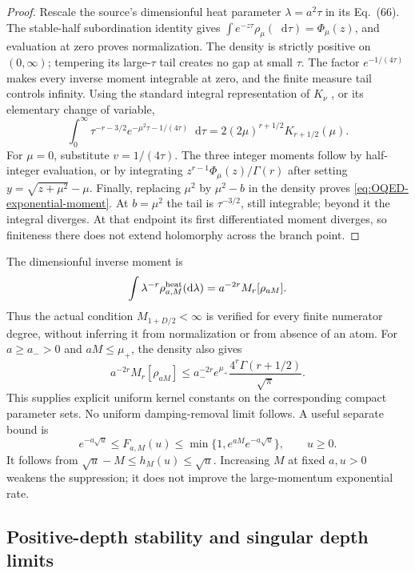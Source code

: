 \documentclass[final,5p,times,twocolumn,numbers,nopreprintline]{elsarticle}
\numberwithin{equation}{section}
\theoremstyle{definition}
\theoremstyle{remark}
\newcommand{\dd}{\mathop{}\!\mathrm d}
\newcommand{\Ph}{\Phi}
\begin{document}
\begin{proof}
Rescale the source's dimensionful heat parameter \(\lambda=a^2\tau\)
in its Eq.~(66). The stable-half subordination identity gives
\(\int e^{-z\tau}\rho_\mu(\dd\tau)=\Ph_\mu(z)\), and evaluation
at zero proves normalization. The density is strictly positive on
\((0,\infty)\); tempering its large-\(\tau\) tail creates no gap
at small \(\tau\). The factor \(e^{-1/(4\tau)}\) makes every inverse
moment integrable at zero, and the finite measure tail controls infinity.
Using the standard integral representation of \(K_\nu\)
\cite[Eq.~10.32.10]{DLMF10}, or its elementary change of variable,
\[
 \int_0^\infty \tau^{-r-3/2}e^{-\mu^2\tau-1/(4\tau)}\dd\tau
       =2(2\mu)^{r+1/2}K_{r+1/2}(\mu).
\]
For \(\mu=0\), substitute \(v=1/(4\tau)\). The three integer
moments follow by half-integer evaluation, or by integrating
\(z^{r-1}\Ph_\mu(z)/\Gamma(r)\) after setting
\(y=\sqrt{z+\mu^2}-\mu\). Finally, replacing \(\mu^2\) by
\(\mu^2-b\) in the density proves
\eqref{eq:OQED-exponential-moment}. At \(b=\mu^2\) the tail is
\(\tau^{-3/2}\), still integrable; beyond it the integral diverges.
At that endpoint its first differentiated moment diverges, so finiteness
there does not extend holomorphy across the branch point.
\end{proof}

The dimensionful inverse moment is
\begin{equation}
 \int\lambda^{-r}\rho^{\rm heat}_{a,M}(\dd\lambda)
       =a^{-2r}M_r[\rho_{aM}].
\label{eq:OQED-dimensional-moment}
\end{equation}
Thus the actual condition \(M_{1+D/2}<\infty\) is verified for every
finite numerator degree, without inferring it from normalization or
from absence of an atom. For \(a\geq a_->0\) and \(aM\leq\mu_+\), the density also gives
\[
 a^{-2r}M_r[\rho_{aM}]
 \leq a_-^{-2r}e^{\mu_+}\frac{4^r\Gamma(r+1/2)}{\sqrt\pi}.
\]
This supplies explicit uniform kernel constants on the corresponding
compact parameter sets. No uniform damping-removal limit follows.
A useful separate bound is
\begin{equation}
 e^{-a\sqrt u}\leq F_{a,M}(u)
       \leq\min\{1,e^{aM}e^{-a\sqrt u}\},\qquad u\geq0.
\label{eq:OQED-linear-exponential-bounds}
\end{equation}
It follows from \(\sqrt u-M\leq h_M(u)\leq\sqrt u\).
Increasing \(M\) at fixed \(a,u>0\) weakens the suppression; it does
not improve the large-momentum exponential rate.


\subsection{Positive-depth stability and singular depth limits}
\label{sec:OQED-depth-limits}
\end{document}
